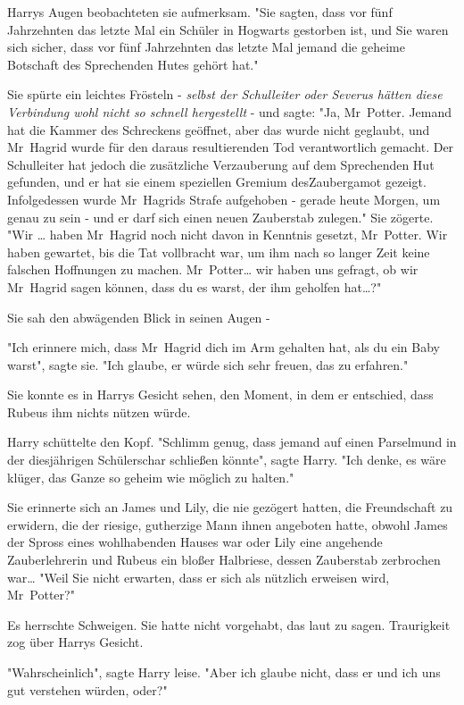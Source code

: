 {Harrys Augen beobachteten sie aufmerksam. "Sie sagten, dass vor fünf Jahrzehnten das letzte Mal ein Schüler in Hogwarts gestorben ist, und Sie waren sich sicher, dass vor fünf Jahrzehnten das letzte Mal jemand die geheime Botschaft des Sprechenden Hutes gehört hat."

Sie spürte ein leichtes Frösteln - \emph{selbst der Schulleiter oder Severus hätten diese Verbindung wohl nicht so schnell hergestellt} - und sagte: "Ja, Mr~Potter. Jemand hat die Kammer des Schreckens geöffnet, aber das wurde nicht geglaubt, und Mr~Hagrid wurde für den daraus resultierenden Tod verantwortlich gemacht. Der Schulleiter hat jedoch die zusätzliche Verzauberung auf dem Sprechenden Hut gefunden, und er hat sie einem speziellen Gremium desZaubergamot gezeigt. Infolgedessen wurde Mr~Hagrids Strafe aufgehoben - gerade heute Morgen, um genau zu sein - und er darf sich einen neuen Zauberstab zulegen." Sie zögerte. "Wir … haben Mr~Hagrid noch nicht davon in Kenntnis gesetzt, Mr~Potter. Wir haben gewartet, bis die Tat vollbracht war, um ihm nach so langer Zeit keine falschen Hoffnungen zu machen. Mr~Potter… wir haben uns gefragt, ob wir Mr~Hagrid sagen können, dass du es warst, der ihm geholfen hat…?"

Sie sah den abwägenden Blick in seinen Augen -

"Ich erinnere mich, dass Mr~Hagrid dich im Arm gehalten hat, als du ein Baby warst", sagte sie. "Ich glaube, er würde sich sehr freuen, das zu erfahren."

Sie konnte es in Harrys Gesicht sehen, den Moment, in dem er entschied, dass Rubeus ihm nichts nützen würde.

Harry schüttelte den Kopf. "Schlimm genug, dass jemand auf einen Parselmund in der diesjährigen Schülerschar schließen könnte", sagte Harry. "Ich denke, es wäre klüger, das Ganze so geheim wie möglich zu halten."

Sie erinnerte sich an James und Lily, die nie gezögert hatten, die Freundschaft zu erwidern, die der riesige, gutherzige Mann ihnen angeboten hatte, obwohl James der Spross eines wohlhabenden Hauses war oder Lily eine angehende Zauberlehrerin und Rubeus ein bloßer Halbriese, dessen Zauberstab zerbrochen war… "Weil Sie nicht erwarten, dass er sich als nützlich erweisen wird, Mr~Potter?"

Es herrschte Schweigen. Sie hatte nicht vorgehabt, das laut zu sagen. Traurigkeit zog über Harrys Gesicht.

"Wahrscheinlich", sagte Harry leise. "Aber ich glaube nicht, dass er und ich uns gut verstehen würden, oder?"

}

